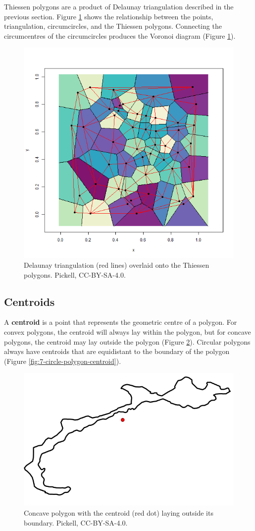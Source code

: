 \documentclass[
]{book}
\begin{document}
Thiessen polygons are a product of Delaunay triangulation described in the previous section. Figure \ref{fig:7-delaunay-triangulation-thiessen-polygons} shows the relationship between the points, triangulation, circumcircles, and the Thiessen polygons. Connecting the circumcentres of the circumcircles produces the Voronoi diagram (Figure \ref{fig:7-delaunay-triangulation-thiessen-polygons}).

\begin{figure}
\includegraphics[width=0.75\linewidth]{images/07-delaunay-triangulation-thiessen-polygons} \caption{Delaunay triangulation (red lines) overlaid onto the Thiessen polygons. Pickell, CC-BY-SA-4.0.}\label{fig:7-delaunay-triangulation-thiessen-polygons}
\end{figure}

\subsection{Centroids}\label{centroids}

A \textbf{centroid} is a point that represents the geometric centre of a polygon. For convex polygons, the centroid will always lay within the polygon, but for concave polygons, the centroid may lay outside the polygon (Figure \ref{fig:7-concave-polygon-centroid}). Circular polygons always have centroids that are equidistant to the boundary of the polygon (Figure \ref{fig:7-circle-polygon-centroid}).

\begin{figure}
\includegraphics[width=0.5\linewidth]{images/07-concave-polygon-centroid} \caption{Concave polygon with the centroid (red dot) laying outside its boundary. Pickell, CC-BY-SA-4.0.}\label{fig:7-concave-polygon-centroid}
\end{figure}
\end{document}
